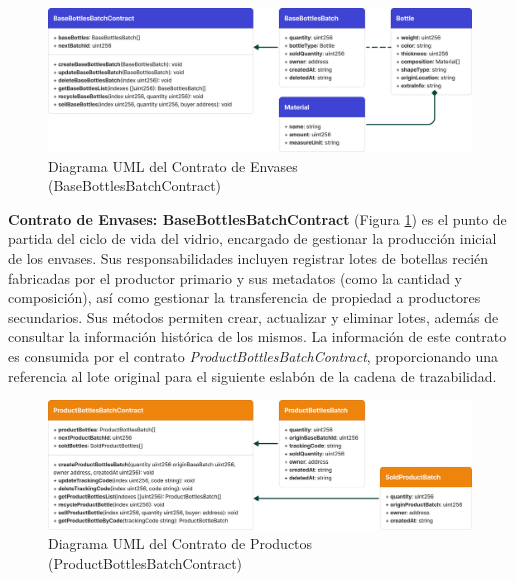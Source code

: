 \begin{figure}[!htb]
    \centering
    \includegraphics[width=\linewidth]{Figures/uml-producer-contract.png}
    \caption{Diagrama UML del Contrato de Envases (BaseBottlesBatchContract)}
    \label{fig:bottles-contract-uml}
\end{figure}

\textbf{Contrato de Envases: BaseBottlesBatchContract} (Figura \ref{fig:bottles-contract-uml})
 es el punto de partida del ciclo de vida del vidrio, encargado de gestionar la producción inicial de los envases. Sus responsabilidades incluyen registrar lotes de botellas recién fabricadas por el productor primario y sus metadatos (como la cantidad y composición), así como gestionar la transferencia de propiedad a productores secundarios. Sus métodos permiten crear, actualizar y eliminar lotes, además de consultar la información histórica de los mismos. La información de este contrato es consumida por el  contrato \textit{ProductBottlesBatchContract}, proporcionando una referencia al lote original para el siguiente eslabón de la cadena de trazabilidad.

\begin{figure}[!htb]
    \centering
    \includegraphics[width=\linewidth]{Figures/uml-product-contract.png}
    \caption{Diagrama UML del Contrato de Productos (ProductBottlesBatchContract)}
    \label{fig:product-contract-uml}
\end{figure}

